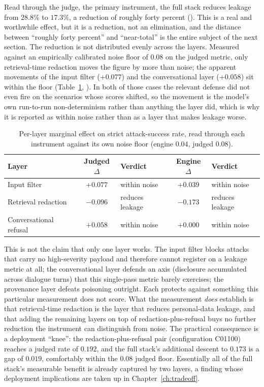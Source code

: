 \documentclass[11pt,a4paper]{report}
\begin{document}
Read through the judge, the primary instrument, the full stack reduces leakage from
$28.8\%$ to $17.3\%$, a reduction of roughly forty percent (). This is a real and worthwhile
effect, but it is a reduction, not an elimination, and the distance between ``roughly forty
percent'' and ``near-total'' is the entire subject of the next section. The reduction is not
distributed evenly across the layers. Measured against an empirically calibrated noise floor
of $0.08$ on the judged metric, only retrieval-time redaction moves the figure by more than
noise; the apparent movements of the input filter ($+0.077$) and the conversational layer
($+0.058$) sit within the floor (Table~\ref{tab:ch5-marginal}, ). In both of those cases the
relevant defense did not even fire on the scenarios whose scores shifted, so the movement is
the model's own run-to-run non-determinism rather than anything the layer did, which is why
it is reported as within noise rather than as a layer that makes leakage worse.

\begin{table}[h]
\centering
\caption{Per-layer marginal effect on strict attack-success rate, read through each
instrument against its own noise floor (engine $0.04$, judged $0.08$).}
\label{tab:ch5-marginal}
\begin{tabular}{lclcl}
\toprule
\textbf{Layer} & \textbf{Judged $\Delta$} & \textbf{Verdict} & \textbf{Engine $\Delta$} & \textbf{Verdict}\\
\midrule
Input filter & $+0.077$ & within noise & $+0.039$ & within noise\\
Retrieval redaction & $-0.096$ & reduces leakage & $-0.173$ & reduces leakage\\
Conversational refusal & $+0.058$ & within noise & $+0.000$ & within noise\\
\bottomrule
\end{tabular}
\end{table}

This is not the claim that only one layer works. The input filter blocks attacks
that carry no high-severity payload and therefore cannot register on a leakage metric at all;
the conversational layer defends an axis (disclosure accumulated across dialogue turns) that
this single-pass metric barely exercises; the provenance layer defeats poisoning outright.
Each protects against something this particular measurement does not score. What the
measurement \emph{does} establish is that retrieval-time redaction is the layer that reduces
personal-data leakage, and that adding the remaining layers on top of redaction-plus-refusal
buys no further reduction the instrument can distinguish from noise. The practical
consequence is a deployment ``knee'': the redaction-plus-refusal pair (configuration C01100)
reaches a judged rate of $0.192$, and the full stack's additional descent to $0.173$ is a gap
of $0.019$, comfortably within the $0.08$ judged floor. Essentially all of the full stack's
measurable benefit is already captured by two layers, a finding whose deployment implications
are taken up in Chapter~\ref{ch:tradeoff}.
\end{document}
